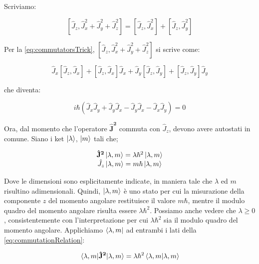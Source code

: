 Scriviamo:

	\begin{equation}
		\left [ \hat{J}_z, \hat{J}_x^2 + \hat{J}_y^2 + \hat{J}_z^2 \right ] = \left [ \hat{J}_z, \hat{J}_x^2 \right ] + \left [ \hat{J}_z, \hat{J}_y^2 \right ]
	\end{equation}

Per la \eqref{eq:commutatorsTrick}, $\left [ \hat{J}_z, \hat{J}_x^2 + \hat{J}_y^2 + \hat{J}_z^2 \right ]$ si scrive come:

	\begin{equation}
	 \hat{J}_x \left [ \hat{J}_z, \hat{J}_x \right ] + \left [ \hat{J}_z , \hat{J}_x \right ] \hat{J}_x + \hat{J}_y \left [ \hat{J}_z, \hat{J}_y \right ] + \left [ \hat{J}_z , \hat{J}_y \right ] \hat{J}_y 
	\end{equation}

che diventa:

	\begin{equation}
		i \hbar \left ( \hat{J}_x \hat{J}_y + \hat{J}_y \hat{J}_x - \hat{J}_y \hat{J}_x - \hat{J}_x \hat{J}_y \right ) = 0
	\end{equation}

Ora, dal momento che l'operatore $\mathbf{\hat{J}^2}$ commuta con $\hat{J}_z$, devono avere autostati in comune. Siano i ket $\ket{\lambda}$, $\ket{m}$ tali che;

	\begin{equation} \label{eq:commutationRelation}
		\begin{array} {c}
			\mathbf{\hat{J}^2} \ket{\lambda, m} = \lambda \hbar^2 \ket{\lambda, m} \\
			\hat{J}_z \ket{\lambda, m} = m \hbar \ket{\lambda, m}
		\end{array}
	\end{equation}

Dove le dimensioni sono esplicitamente indicate, in maniera tale che $\lambda$ ed $m$ risultino adimensionali. Quindi, $\ket{\lambda, m}$ \`e uno stato per cui la misurazione della componente $z$ del momento angolare restituisce il valore $m \hbar$, mentre il modulo quadro del momento angolare risulta essere $\lambda \hbar^2$. Possiamo anche vedere che $\lambda \ge 0$, consistentemente con l'interpretazione per cui $\lambda \hbar^2$ sia il modulo quadro del momento angolare. Applichiamo $\bra{\lambda, m}$ ad entrambi i lati della \eqref{eq:commutationRelation}:

	\begin{equation}
		\mel{\lambda, m}{\mathbf{\hat{J}^2}}{\lambda, m} = \lambda \hbar^2 \braket{\lambda, m}{\lambda, m}
	\end{equation}

